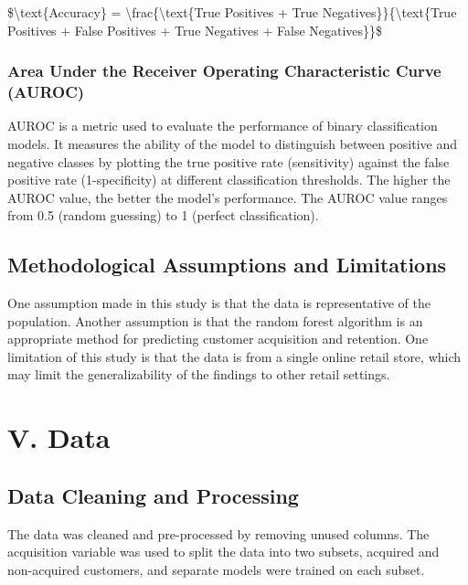 \$\textbackslash text\{Accuracy\} =
\textbackslash frac\{\textbackslash text\{True Positives + True
Negatives\}\}\{\textbackslash text\{True Positives + False Positives +
True Negatives + False Negatives\}\}\$

\hypertarget{area-under-the-receiver-operating-characteristic-curve-auroc}{%
\subsubsection{Area Under the Receiver Operating Characteristic Curve
(AUROC)}\label{area-under-the-receiver-operating-characteristic-curve-auroc}}

AUROC is a metric used to evaluate the performance of binary
classification models. It measures the ability of the model to
distinguish between positive and negative classes by plotting the true
positive rate (sensitivity) against the false positive rate
(1-specificity) at different classification thresholds. The higher the
AUROC value, the better the model's performance. The AUROC value ranges
from 0.5 (random guessing) to 1 (perfect classification).

\hypertarget{methodological-assumptions-and-limitations}{%
\subsection{Methodological Assumptions and
Limitations}\label{methodological-assumptions-and-limitations}}

One assumption made in this study is that the data is representative of
the population. Another assumption is that the random forest algorithm
is an appropriate method for predicting customer acquisition and
retention. One limitation of this study is that the data is from a
single online retail store, which may limit the generalizability of the
findings to other retail settings.

\hypertarget{v-data}{%
\section{V. Data}\label{v-data}}

\hypertarget{data-cleaning-and-processing}{%
\subsection{Data Cleaning and
Processing}\label{data-cleaning-and-processing}}

The data was cleaned and pre-processed by removing unused columns. The
acquisition variable was used to split the data into two subsets,
acquired and non-acquired customers, and separate models were trained on
each subset.

